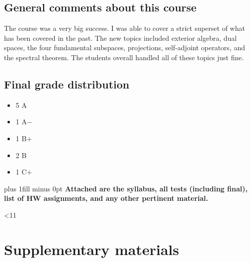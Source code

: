 \documentclass[11pt,oneside]{amsart}
\begin{document}
\subsection{General comments about this course}
The course was a very big success. I was able to cover a strict superset of what has been covered in the past. The new topics included exterior algebra, dual spaces, the four fundamental subspaces, projections, self-adjoint operators, and the spectral theorem. The students overall handled all of these topics just fine.

\subsection{Final grade distribution}
\begin{itemize}
    \item 5 A
    \item 1 A$-$
    \item 1 B$+$
    \item 2 B
    \item 1 C$+$
\end{itemize}

\vskip 0pt plus 1fill minus 0pt
\noindent
\textbf{Attached are the syllabus, all tests (including final), list of
  HW assignments, and any other pertinent material.} 
\newpage






\setcounter{int}{1}
\loop
    
    \addtocounter{int}{1}
\ifnum \value{int}<11
\repeat

\appendix
\section{Supplementary materials}



\end{document}
